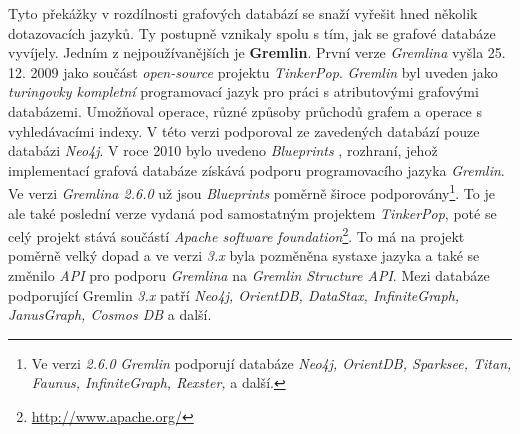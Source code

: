 Tyto překážky v rozdílnosti grafových databází se snaží vyřešit hned několik dotazovacích jazyků. Ty postupně vznikaly spolu s tím, jak se grafové databáze vyvíjely. Jedním z nejpoužívanějších je \textbf{Gremlin}. První verze \textit{Gremlina} vyšla 25. 12. 2009 \cite{Gremlin09} jako součást \textit{open-source} projektu \textit{TinkerPop}. \textit{Gremlin} byl uveden jako \textit{turingovky kompletní} programovací jazyk pro práci s atributovými grafovými databázemi. Umožňoval \textit{} operace, různé způsoby průchodů grafem a operace s vyhledávacími indexy. V této verzi podporoval ze zavedených databází pouze databázi \textit{Neo4j}. 
V roce 2010 bylo uvedeno \textit{Blueprints} \cite{Blueprints10}, rozhraní, jehož implementací grafová databáze získává podporu programovacího jazyka \textit{Gremlin}. 
Ve verzi \textit{Gremlina 2.6.0} \cite{Gremlin14} už jsou \textit{Blueprints} poměrně široce podporovány\footnote{Ve verzi \textit{2.6.0} \textit{Gremlin} podporují databáze \textit{Neo4j, OrientDB, Sparksee, Titan, Faunus, InfiniteGraph, Rexster,} a další.}. To je ale také poslední verze vydaná pod samostatným projektem \textit{TinkerPop}, poté se celý projekt stává součástí \textit{Apache software foundation}\footnote{\url{http://www.apache.org/}}. To má na projekt poměrně velký dopad a ve verzi \textit{3.x} \cite{Gremlin17} byla pozměněna systaxe jazyka a také se změnilo \textit{API} pro podporu \textit{Gremlina} na \textit{Gremlin Structure API}. Mezi databáze podporující Gremlin \textit{3.x} patří \textit{Neo4j, OrientDB, DataStax, InfiniteGraph, JanusGraph, Cosmos DB} a další.





 






